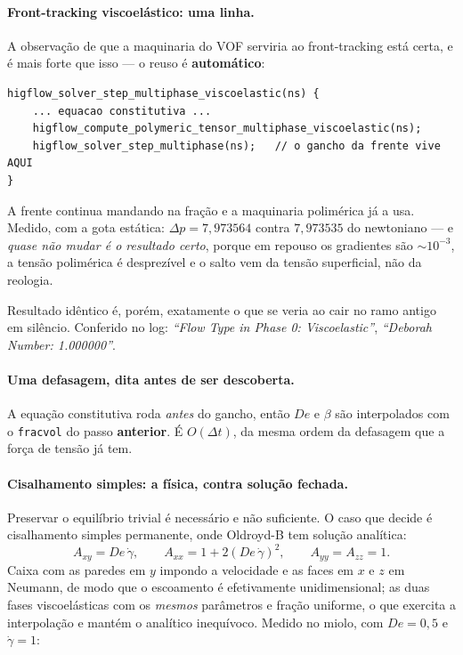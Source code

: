 \paragraph{Front-tracking viscoel\'astico: uma linha.} A observa\c{c}\~ao de que
a maquinaria do VOF serviria ao front-tracking est\'a certa, e \'e mais forte que
isso --- o reuso \'e \textbf{autom\'atico}:
\begin{verbatim}
higflow_solver_step_multiphase_viscoelastic(ns) {
    ... equacao constitutiva ...
    higflow_compute_polymeric_tensor_multiphase_viscoelastic(ns);
    higflow_solver_step_multiphase(ns);   // o gancho da frente vive AQUI
}
\end{verbatim}
A frente continua mandando na fra\c{c}\~ao e a maquinaria polim\'erica j\'a a usa.
Medido, com a gota est\'atica: $\Delta p = 7{,}973564$ contra $7{,}973535$ do
newtoniano --- e \emph{quase n\~ao mudar \'e o resultado certo}, porque em repouso
os gradientes s\~ao $\sim10^{-3}$, a tens\~ao polim\'erica \'e desprez\'ivel e o
salto vem da tens\~ao superficial, n\~ao da reologia.

Resultado id\^entico \'e, por\'em, exatamente o que se veria ao cair no ramo
antigo em sil\^encio. Conferido no log: \emph{``Flow Type in Phase 0:
Viscoelastic''}, \emph{``Deborah Number: 1.000000''}.

\paragraph{Uma defasagem, dita antes de ser descoberta.} A equa\c{c}\~ao
constitutiva roda \emph{antes} do gancho, ent\~ao $De$ e $\beta$ s\~ao
interpolados com o \texttt{fracvol} do passo \textbf{anterior}. \'E $O(\Delta t)$,
da mesma ordem da defasagem que a for\c{c}a de tens\~ao j\'a tem.

\paragraph{Cisalhamento simples: a f\'isica, contra solu\c{c}\~ao fechada.}
Preservar o equil\'ibrio trivial \'e necess\'ario e n\~ao suficiente. O caso que
decide \'e cisalhamento simples permanente, onde Oldroyd-B tem solu\c{c}\~ao
anal\'itica:
\begin{equation}
  A_{xy} = De\,\dot\gamma, \qquad
  A_{xx} = 1 + 2(De\,\dot\gamma)^2, \qquad
  A_{yy} = A_{zz} = 1 .
  \label{eq:oldroyd-cisalha}
\end{equation}
Caixa com as paredes em $y$ impondo a velocidade e as faces em $x$ e $z$ em
Neumann, de modo que o escoamento \'e efetivamente unidimensional; as duas fases
viscoel\'asticas com os \emph{mesmos} par\^ametros e fra\c{c}\~ao uniforme, o que
exercita a interpola\c{c}\~ao e mant\'em o anal\'itico inequ\'ivoco.
Medido no miolo, com $De=0{,}5$ e $\dot\gamma=1$:


